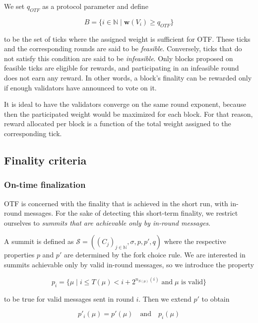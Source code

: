 \documentclass[12pt]{article}
\begin{document}
We set $q_{OTF}$ as a protocol parameter and define

\begin{equation}
B=\{i\in \mathbb{N} \mid \boldsymbol{w}(V_i)\geq q_{OTF}\}
\end{equation}

to be the set of ticks where the assigned weight is sufficient for OTF. These ticks and the corresponding rounds are said to be \emph{feasible}. Conversely, ticks that do not satisfy this condition are said to be \emph{infeasible}. Only blocks proposed on feasible ticks are eligible for rewards, and participating in an infeasible round does not earn any reward. In other words, a block's finality can be rewarded only if enough validators have announced to vote on it.

It is ideal to have the validators converge on the same round exponent, because then the participated weight would be maximized for each block. For that reason, reward allocated per block is a function of the total weight assigned to the corresponding tick.

\subsection{Finality criteria}
\label{finality-criteria}

\subsubsection*{On-time finalization}
\label{on-time-finalization}

OTF is concerned with the finality that is achieved in the short run, with in-round messages. For the sake of detecting this short-term finality, we restrict ourselves to \emph{summits that are achievable only by in-round messages}.

A summit is defined as $\mathcal{S}=((C_j)_{j\in\mathbb{N}}, \sigma,p,p',q)$ where the respective properties $p$ and $p'$ are determined by the fork choice rule. We are interested in summits achievable only by valid in-round messages, so we introduce the property

\begin{equation}
  p_i = \{\mu \mid i \leq T(\mu)< i+2^{n_{S(\mu) }(i)}\;\text{and}\;\mu\text{ is valid}\}
\end{equation}

to be true for valid messages sent in round $i$. Then we extend $p'$ to obtain

\begin{equation}
  p'_{i}(\mu) = p'(\mu)\quad\text{and}\quad p_{i}(\mu)
\end{equation}
\end{document}
